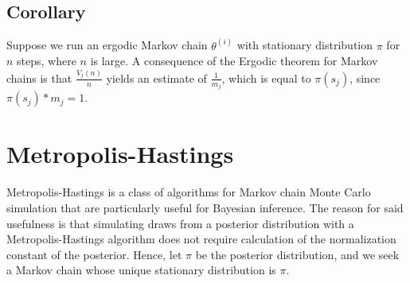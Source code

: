 \documentclass[12pt,twoside]{reedthesis}
\begin{document}
		\subsection*{Corollary}
		Suppose we run an ergodic Markov chain $\theta^{(i)}$ with stationary distribution $\pi$ for $n$ steps, where $n$ is large. A consequence of the Ergodic theorem for Markov chains is that $\frac{V_j(n)}{n}$ yields an estimate of $\frac{1}{m_j}$, which is equal to $\pi(s_j)$, since $\pi(s_j) * m_j = 1$.
	\section{Metropolis-Hastings}
			Metropolis-Hastings is a class of algorithms for Markov chain Monte Carlo simulation that are particularly useful for Bayesian inference. The reason for said usefulness is that simulating draws from a posterior distribution with a Metropolis-Hastings algorithm does not require calculation of the normalization constant of the posterior. Hence, let $\pi$ be the posterior distribution, and we seek a Markov chain whose unique stationary distribution is $\pi$.
			
			
\end{document}
